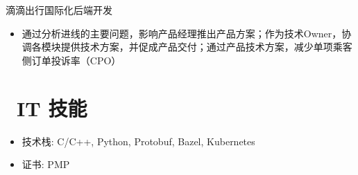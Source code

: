 \documentclass{resume}
\begin{document}
滴滴出行国际化后端开发
\begin{itemize}
  \item 通过分析进线的主要问题，影响产品经理推出产品方案；作为技术Owner，协调各模块提供技术方案，并促成产品交付；通过产品技术方案，减少单项乘客侧订单投诉率（CPO）
\end{itemize}



\section{\faCogs\ IT 技能}
\begin{itemize}[parsep=0.5ex]
  \item 技术栈: C/C++, Python, Protobuf, Bazel, Kubernetes
  \item 证书: PMP
\end{itemize}

%
%
\end{document}
